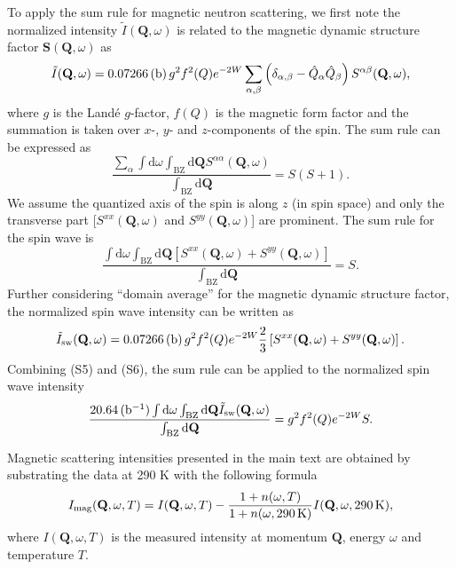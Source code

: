 \documentclass[%
reprint,
superscriptaddress,
amsmath,amssymb,
aps,
prb,
]{revtex4-2}
\begin{document}
	To apply the sum rule for magnetic neutron scattering, we first note the normalized intensity $\tilde{I} (\textbf{Q},\omega)$ is related to the magnetic dynamic structure factor $\textbf{S}(\textbf{Q}, \omega)$ as \cite{XuRSI2013,LorenzanaPRB2005}
	\begin{equation}
		\tilde{I} (\textbf{Q},\omega) = 0.07266 \,({\rm b}) \, g^2f^2(Q)e^{-2W}\sum_{\alpha,\beta}{\left(\delta_{\alpha,\beta}-\hat{Q}_{\alpha}\hat{Q}_{\beta}\right)S^{\alpha \beta}(\textbf{Q},\omega)},
	\end{equation}
	where $g$ is the Land\'e $g$-factor, $f(Q)$ is the magnetic form factor and the summation is taken over $x$-, $y$- and $z$-components of the spin. The sum rule can be expressed as \cite{XuRSI2013,LorenzanaPRB2005}
	\begin{equation}
		\frac{\sum_{\alpha}\int \mathrm{d}\omega\int_{\mathrm{BZ}}\mathrm{d}\textbf{Q}S^{\alpha \alpha}(\textbf{Q},\omega)}{\int_{\mathrm{BZ}}\mathrm{d}\textbf{Q}}=S(S+1).
	\end{equation}
	We assume the quantized axis of the spin is along $z$ (in spin space) and only the transverse part [$S^{xx} (\textbf{Q},\omega)$ and $S^{yy} (\textbf{Q},\omega)$] are prominent. The sum rule for the spin wave is
	\begin{equation}
		\frac{\int \mathrm{d}\omega\int_{\mathrm{BZ}}\mathrm{d}\textbf{Q}\left[S^{xx}(\textbf{Q},\omega)+S^{yy}(\textbf{Q},\omega)\right]}{\int_{\mathrm{BZ}}\mathrm{d}\textbf{Q}}=S.
	\end{equation}
	Further considering ``domain average'' for the magnetic dynamic structure factor, the normalized spin wave intensity can be written as \cite{LorenzanaPRB2005}
	\begin{equation}
		\tilde{I}_{\mathrm{sw}} (\textbf{Q},\omega) = 0.07266 \,({\rm b}) \, g^2f^2(Q)e^{-2W} \frac{2}{3} \left[S^{xx}(\textbf{Q},\omega)+S^{yy}(\textbf{Q},\omega)\right].
	\end{equation}
	Combining (S5) and (S6), the sum rule can be applied to the normalized spin wave intensity
	\begin{equation}
		\frac{20.64\,({\rm b^{-1}})\int \mathrm{d}\omega\int_{\mathrm{BZ}}\mathrm{d}\textbf{Q}\tilde{I}_{\mathrm{sw}} (\textbf{Q},\omega)}{\int_{\mathrm{BZ}}\mathrm{d}\textbf{Q}}=g^2f^2(Q)e^{-2W}S.
	\end{equation}
	
	Magnetic scattering intensities presented in the main text are obtained by substrating the data at 290 K with the following formula
	\begin{equation}
		I_{\mathrm{mag}}(\textbf{Q}, \omega, T) = I(\textbf{Q}, \omega, T) - \frac{1+n(\omega, T)}{1+n(\omega, 290 \, {\rm K})}I(\textbf{Q}, \omega, 290 \, {\rm K}),
	\end{equation}
	where $I(\textbf{Q}, \omega, T)$ is the measured intensity at momentum $\textbf{Q}$, energy $\omega$ and temperature $T$.
	
\end{document}
